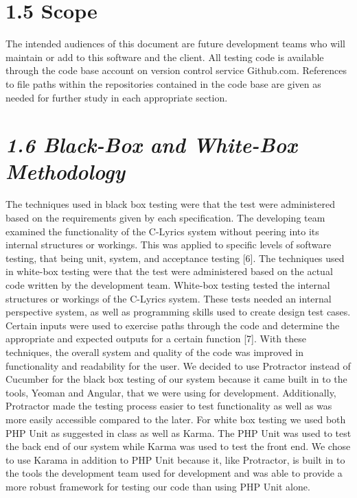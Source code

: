 \documentclass[]{article}
\begin{document}
\section{\textbf{1.5 Scope}}\label{scope}

The intended audiences of this document are future development teams who
will maintain or add to this software and the client. All testing code
is available through the code base account on version control service
Github.com. References to file paths within the repositories contained
in the code base are given as needed for further study in each
appropriate section.

\section{\emph{1.6 Black-Box and White-Box
Methodology}}\label{black-box-and-white-box-methodology}

The techniques used in black box testing were that the test were
administered based on the requirements given by each specification. The
developing team examined the functionality of the C-Lyrics system
without peering into its internal structures or workings. This was
applied to specific levels of software testing, that being unit, system,
and acceptance testing {[}6{]}. The techniques used in white-box testing
were that the test were administered based on the actual code written by
the development team. White-box testing tested the internal structures
or workings of the C-Lyrics system. These tests needed an internal
perspective system, as well as programming skills used to create design
test cases. Certain inputs were used to exercise paths through the code
and determine the appropriate and expected outputs for a certain
function {[}7{]}. With these techniques, the overall system and quality
of the code was improved in functionality and readability for the user.
We decided to use Protractor instead of Cucumber for the black box
testing of our system because it came built in to the tools, Yeoman and
Angular, that we were using for development. Additionally, Protractor
made the testing process easier to test functionality as well as was
more easily accessible compared to the later. For white box testing we
used both PHP Unit as suggested in class as well as Karma. The PHP Unit
was used to test the back end of our system while Karma was used to test
the front end. We chose to use Karama in addition to PHP Unit because
it, like Protractor, is built in to the tools the development team used
for development and was able to provide a more robust framework for
testing our code than using PHP Unit alone.
\end{document}
